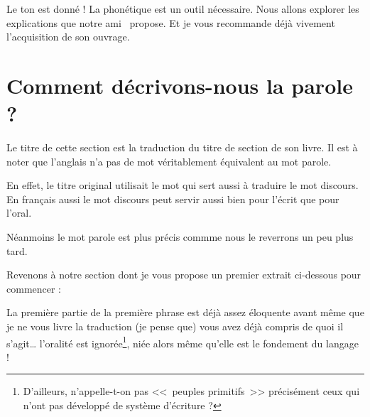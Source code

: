 Le ton est donné ! La phonétique est un outil nécessaire. Nous allons
explorer les explications que notre ami~\cite{lodge} propose. Et je vous
recommande déjà vivement l'acquisition de son ouvrage.

\newpage
\minitoc
\newpage

\section{Comment décrivons-nous la parole ?}

Le titre de cette section est la traduction du titre de section de son
livre. Il est à noter que l'anglais n'a pas de mot véritablement
équivalent au mot parole.

En effet, le titre original utilisait le mot  qui sert
aussi à traduire le mot discours. En français aussi le mot discours
peut servir aussi bien pour l'écrit que pour l'oral.

Néanmoins le mot parole est plus précis commme nous le reverrons un
peu plus tard.

Revenons à notre section dont je vous propose un premier extrait ci-dessous pour commencer :

\begin{center}
\begin{mdframed}[style=citestyle, frametitle={Extrait de~\cite{lodge}}]
\end{mdframed}  
\end{center}


La première partie de la première phrase est déjà assez éloquente avant même
que je ne vous livre la traduction (je pense que) vous avez déjà compris de quoi il
s'agit\dots{} l'oralité est ignorée\footnote{D'ailleurs,
  n'appelle-t-on pas <<~peuples primitifs~>> précisément ceux qui
  n'ont pas développé de système d'écriture ?}, niée alors même qu'elle est le
fondement du langage !

